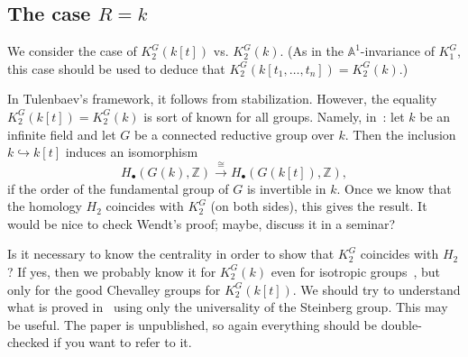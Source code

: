 \documentclass[oneside,12pt]{amsart}
\numberwithin{equation}{section}
\numberwithin{lem}{section}
\theoremstyle{definition}
\theoremstyle{remark}
\newcommand{\Aff}{\mathbb {A}}
\begin{document}
\subsection{The case $R=k$}
We consider the case of $K_2^G(k[t])$ vs. $K_2^G(k)$.
(As in the $\Aff^1$-invariance of $K_1^G$, this case should be used to deduce that $K_2^G(k[t_1,\ldots,t_n])=K_2^G(k)$.)

In Tulenbaev's framework, it follows from stabilization.
However, the equality $K_2^G(k[t])=K_2^G(k)$ is sort of known for all groups.
Namely, in~\cite[Theorem 5.1]{W-k[t]}: let $k$ be an infinite field and let $G$ be a connected reductive
group over $k$. Then the inclusion $k\hookrightarrow k[t]$ induces an
isomorphism
$$H_\bullet(G(k),\mathbb{Z})\stackrel{\cong}{\longrightarrow} H_\bullet(G(k[t]),\mathbb{Z}),$$
if the order of the fundamental group of $G$ is invertible in $k$.
Once we know that the homology $H_2$ coincides with $K_2^G$ (on both sides), this gives the result.
It would be nice to check Wendt's proof; maybe, discuss it in a seminar?

Is it necessary to know the centrality in order to show that $K_2^G$ coincides with $H_2$?
If yes, then we probably know it for $K_2^G(k)$ even for isotropic groups~\cite{Deo}, but only for the good
Chevalley groups for $K_2^G(k[t])$.
We should try to understand what is proved in~\cite[Proposition 5.3]{VW} using only the universality of
the Steinberg group. This may be useful. The paper is unpublished, so again everything should be double-checked
if you want to refer to it.
\end{document}
